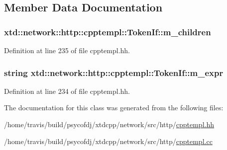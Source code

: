 \subsection{Member Data Documentation}
\hypertarget{classxtd_1_1network_1_1http_1_1cpptempl_1_1TokenIf_afeb13fbde7fb87c9f6321c0c8042e25b}{
\subsubsection[{m\-\_\-children}]{ xtd\-::network\-::http\-::cpptempl\-::\-Token\-If\-::m\-\_\-children}}\label{classxtd_1_1network_1_1http_1_1cpptempl_1_1TokenIf_afeb13fbde7fb87c9f6321c0c8042e25b}


Definition at line 235 of file cpptempl.\-hh.

\hypertarget{classxtd_1_1network_1_1http_1_1cpptempl_1_1TokenIf_a1d1181e1717358dd9e1a37387dfd5454}{
\subsubsection[{m\-\_\-expr}]{\setlength{\rightskip}{0pt plus 5cm}string xtd\-::network\-::http\-::cpptempl\-::\-Token\-If\-::m\-\_\-expr}}\label{classxtd_1_1network_1_1http_1_1cpptempl_1_1TokenIf_a1d1181e1717358dd9e1a37387dfd5454}


Definition at line 234 of file cpptempl.\-hh.



The documentation for this class was generated from the following files\-:\begin{DoxyCompactItemize}
\item 
/home/travis/build/psycofdj/xtdcpp/network/src/http/\hyperlink{cpptempl_8hh}{cpptempl.\-hh}\item 
/home/travis/build/psycofdj/xtdcpp/network/src/http/\hyperlink{cpptempl_8cc}{cpptempl.\-cc}\end{DoxyCompactItemize}
